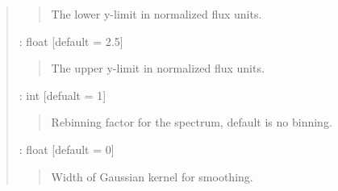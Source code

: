 \documentclass[letterpaper,10pt,english]{sphinxmanual}
\begin{document}
\begin{fulllineitems}
\begin{quote}
\begin{description}
\begin{quote}
The lower y-limit in normalized flux units.
\end{quote}

 : float   {[}default = 2.5{]}
\begin{quote}

The upper y-limit in normalized flux units.
\end{quote}

 : int   {[}defualt = 1{]}
\begin{quote}

Rebinning factor for the spectrum, default is no binning.
\end{quote}

 : float   {[}default = 0{]}
\begin{quote}

Width of Gaussian kernel for smoothing.
\end{quote}

\end{description}\end{quote}

\end{fulllineitems}

\end{document}
